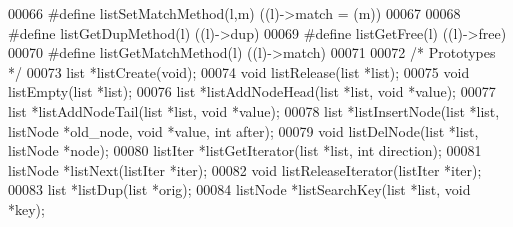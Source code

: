 \begin{DoxyCode}
00066 \textcolor{preprocessor}{#}\textcolor{preprocessor}{define} \textcolor{preprocessor}{listSetMatchMethod}\textcolor{preprocessor}{(}\textcolor{preprocessor}{l}\textcolor{preprocessor}{,}\textcolor{preprocessor}{m}\textcolor{preprocessor}{)} \textcolor{preprocessor}{(}\textcolor{preprocessor}{(}\textcolor{preprocessor}{l}\textcolor{preprocessor}{)}\textcolor{preprocessor}{->}\textcolor{preprocessor}{match} \textcolor{preprocessor}{=} \textcolor{preprocessor}{(}\textcolor{preprocessor}{m}\textcolor{preprocessor}{)}\textcolor{preprocessor}{)}
00067 
00068 \textcolor{preprocessor}{#}\textcolor{preprocessor}{define} \textcolor{preprocessor}{listGetDupMethod}\textcolor{preprocessor}{(}\textcolor{preprocessor}{l}\textcolor{preprocessor}{)} \textcolor{preprocessor}{(}\textcolor{preprocessor}{(}\textcolor{preprocessor}{l}\textcolor{preprocessor}{)}\textcolor{preprocessor}{->}\textcolor{preprocessor}{dup}\textcolor{preprocessor}{)}
00069 \textcolor{preprocessor}{#}\textcolor{preprocessor}{define} \textcolor{preprocessor}{listGetFree}\textcolor{preprocessor}{(}\textcolor{preprocessor}{l}\textcolor{preprocessor}{)} \textcolor{preprocessor}{(}\textcolor{preprocessor}{(}\textcolor{preprocessor}{l}\textcolor{preprocessor}{)}\textcolor{preprocessor}{->}\textcolor{preprocessor}{free}\textcolor{preprocessor}{)}
00070 \textcolor{preprocessor}{#}\textcolor{preprocessor}{define} \textcolor{preprocessor}{listGetMatchMethod}\textcolor{preprocessor}{(}\textcolor{preprocessor}{l}\textcolor{preprocessor}{)} \textcolor{preprocessor}{(}\textcolor{preprocessor}{(}\textcolor{preprocessor}{l}\textcolor{preprocessor}{)}\textcolor{preprocessor}{->}\textcolor{preprocessor}{match}\textcolor{preprocessor}{)}
00071 
00072 \textcolor{comment}{/* Prototypes */}
00073 list *listCreate(\textcolor{keywordtype}{void});
00074 \textcolor{keywordtype}{void} listRelease(list *list);
00075 \textcolor{keywordtype}{void} listEmpty(list *list);
00076 list *listAddNodeHead(list *list, \textcolor{keywordtype}{void} *value);
00077 list *listAddNodeTail(list *list, \textcolor{keywordtype}{void} *value);
00078 list *listInsertNode(list *list, listNode *old\_node, \textcolor{keywordtype}{void} *value, \textcolor{keywordtype}{int} after);
00079 \textcolor{keywordtype}{void} listDelNode(list *list, listNode *node);
00080 listIter *listGetIterator(list *list, \textcolor{keywordtype}{int} direction);
00081 listNode *listNext(listIter *iter);
00082 \textcolor{keywordtype}{void} listReleaseIterator(listIter *iter);
00083 list *listDup(list *orig);
00084 listNode *listSearchKey(list *list, \textcolor{keywordtype}{void} *key);

\end{DoxyCode}
